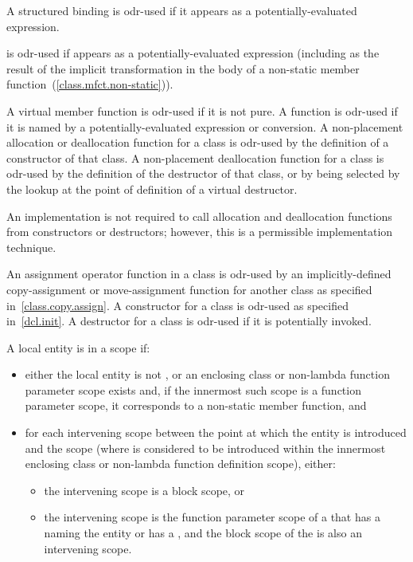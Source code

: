 \pnum
A structured binding is odr-used if it appears as a potentially-evaluated expression.

\pnum
{} is odr-used if  appears as a potentially-evaluated expression
(including as the result of the implicit transformation in the body of a non-static
member function~(\ref{class.mfct.non-static})).

\pnum
A virtual member
function is odr-used if it is not pure.
A function is odr-used if it is named by
a potentially-evaluated expression or conversion.
A non-placement allocation or deallocation
function for a class is odr-used by the definition of a constructor of that
class. A non-placement deallocation function for a class is odr-used by the
definition of the destructor of that class, or by being selected by the
lookup at the point of definition of a virtual
destructor.
\begin{footnote}
An implementation is not required
to call allocation and
deallocation functions from constructors or destructors; however, this
is a permissible implementation technique.
\end{footnote}

\pnum
An assignment operator function in a class is odr-used by an
implicitly-defined
copy-assignment or move-assignment function for another class as specified
in~\ref{class.copy.assign}.
A constructor for a class is odr-used as specified
in~\ref{dcl.init}. A destructor for a class is odr-used if it is potentially
invoked.

\pnum
A local entity
is  in a scope if:
\begin{itemize}
\item either the local entity is not , or
an enclosing class or non-lambda function parameter scope exists and,
if the innermost such scope is a function parameter scope,
it corresponds to a non-static member function, and
\item
for each intervening scope
between the point at which the entity is introduced and the scope
(where  is considered to be introduced
within the innermost enclosing class or non-lambda function definition scope),
either:
\begin{itemize}
\item the intervening scope is a block scope, or
\item the intervening scope is the function parameter scope of a 
that has a 
naming the entity or has a , and
the block scope of the 
is also an intervening scope.
\end{itemize}
\end{itemize}

